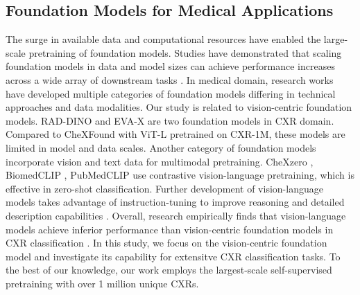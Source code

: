 \subsection{Foundation Models for Medical Applications}
The surge in available data and computational resources have enabled the large-scale pretraining of foundation models. Studies have demonstrated that scaling foundation models in data and model sizes can achieve performance increases across a wide array of downstream tasks \cite{he2022masked, oquab2023dinov2, chen2024towards}. In medical domain, research works have developed multiple categories of foundation models differing in technical approaches and data modalities. Our study is related to vision-centric foundation models. RAD-DINO \cite{perez2024rad} and EVA-X \cite{yao2024eva} are two foundation models in CXR domain. Compared to CheXFound with ViT-L pretrained on CXR-1M, these models are limited in model and data scales. 
Another category of foundation models incorporate vision and text data for multimodal pretraining. CheXzero \cite{tiu2022expert}, BiomedCLIP \cite{zhang2023biomedclip}, PubMedCLIP \cite{eslami2021does} use contrastive vision-language pretraining, which is effective in zero-shot classification. Further development of vision-language models takes advantage of instruction-tuning to improve reasoning and detailed description capabilities \cite{chen2024chexagent, li2024llava, yang2024advancing}. Overall, research empirically finds that vision-language models achieve inferior performance than vision-centric foundation models in CXR classification \cite{perez2024rad}. In this study, we focus on the vision-centric foundation model and investigate its capability for extensitve CXR classification tasks.
To the best of our knowledge, our work employs the largest-scale self-supervised pretraining with over 1 million unique CXRs.

